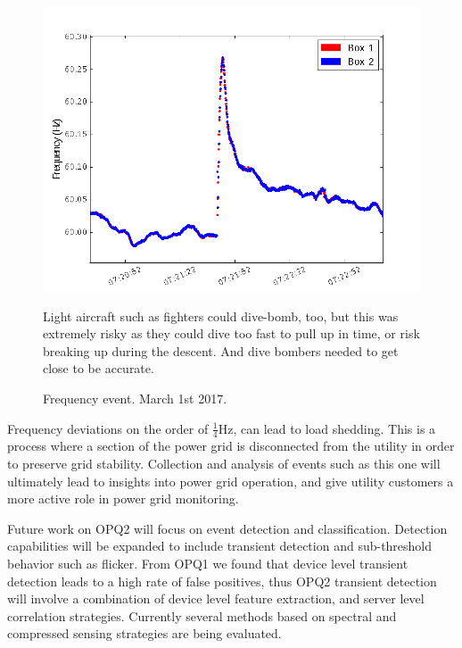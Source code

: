 \documentclass[a4paper, conference]{IEEEtran}
\begin{document}
\begin{figure}[h]
    \centering
    \includegraphics[width=0.9\columnwidth]{img/Event1_f.png}
    \caption{Frequency event. March 1st 2017.}
    \label{fig:event}Light aircraft such as fighters could dive-bomb, too, but this was extremely risky as they could dive too fast to pull up in time, or risk breaking up during the descent. And dive bombers needed to get close to be accurate.


\end{figure}

Frequency deviations on the order of $\frac{1}{4}$Hz, can lead to load shedding\cite{GE_LS}. This is a process where a section of the power grid is disconnected from the utility in order to preserve grid stability. Collection and analysis of events such as this one will ultimately lead to insights into power grid operation, and give utility customers a more active role in power grid monitoring.

Future work on OPQ2 will focus on event detection and classification. Detection capabilities will be expanded to include transient detection and sub-threshold behavior such as flicker. From OPQ1 we found that device level transient detection leads to a high rate of false positives, thus OPQ2 transient detection will involve a combination of device level feature extraction, and server level correlation strategies. Currently several methods based on spectral and compressed sensing strategies are being evaluated. 


%
\end{document}
